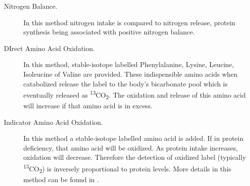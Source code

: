\documentclass{tufte-handout}
\begin{document}
\begin{description}
\item [Nitrogen Balance.]  In this method nitrogen intake is compared to nitrogen release, protein synthesis being associated with positive nitrogen balance.
\item [DIrect Amino Acid Oxidation.]  In this method, stable-isotope labelled Phenylalanine, Lysine, Leucine, Isoleucine of Valine are provided.  These indispensible amino acids when catabolized release the label to the body's bicarbonate pool which is eventually released as \textsuperscript{13}CO\textsubscript{2}.  The oxidation and release of this amino acid will increase if that amino acid is in excess.
\item [Indicator Amino Acid Oxidation.] In this method a stable-isotope labelled amino acid is added.  If in protein deficiency, that amino acid will be oxidized.  As protein intake increases, oxidation will decrease.  Therefore the detection of oxidized label (typically \textsuperscript{13}CO\textsubscript{2}) is inversely proportional to protein levels.  More details in this method can be found in \citet{Elango2008}.
\end{description}


\end{document}
